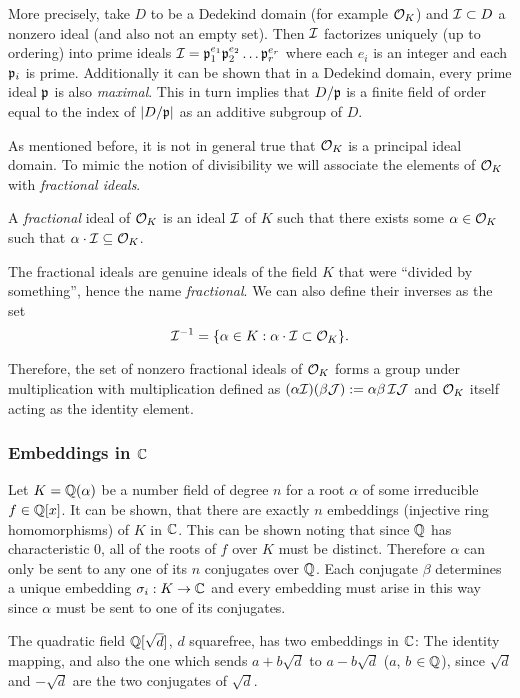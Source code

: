 More precisely, take $D$ to be a Dedekind domain (for example $\mathcal{O}_K$) and $\mathcal{I} \subset D$ a nonzero ideal (and also not an empty set). Then $\mathcal{I}$ factorizes uniquely (up to ordering) into prime ideals $\mathcal{I} = \mathfrak{p}_1^{e_1} \mathfrak{p}_2^{e_2} \ldots \mathfrak{p}_r^{e_r}$ where each $e_i$ is an integer and each $\mathfrak{p}_i$ is prime. Additionally it can be shown that in a Dedekind domain, every prime ideal $\mathfrak{p}$ is also \textit{maximal}. This in turn implies that $D/\mathfrak{p}$ is a finite field of order equal to the index of $|D /\mathfrak{p}|$ as an additive subgroup of $D$.

As mentioned before, it is not in general true that $\mathcal{O}_K$ is a principal ideal domain. To mimic the notion of divisibility we will associate the elements of $\mathcal{O}_K$ with \textit{fractional ideals}.
\begin{definition}
	A \textit{fractional} ideal of $\mathcal{O}_K$ is an ideal $\mathcal{I}$ of $K$ such that there exists some $\alpha \in \mathcal{O}_K$ such that $\alpha \cdot \mathcal{I} \subseteq \mathcal{O}_K$.
\end{definition}
The fractional ideals are genuine ideals of the field $K$ that were ``divided by something'', hence the name \textit{fractional}. We can also define their inverses as the set
\[ \mathcal{I}^{-1} = \{ \alpha \in K : \alpha \cdot \mathcal{I} \subset \mathcal{O}_K \}. \]

Therefore, the set of nonzero fractional ideals of $\mathcal{O}_K$ forms a group under multiplication with multiplication defined as $(\alpha \mathcal{I})(\beta \mathcal{J}) := \alpha \beta \, \mathcal{I} \mathcal{J}$ and $\mathcal{O}_K$ itself acting as the identity element. %

\subsubsection*{Embeddings in $\mathbb{C}$} 
Let $K = \mathbb{Q}(\alpha)$ be a number field of degree $n$ for a root $\alpha$ of some irreducible $f \in \mathbb{Q}[x]$. It can be shown, that there are exactly $n$ embeddings (injective ring homomorphisms) of $K$ in $\mathbb{C}$. This can be shown noting that since $\mathbb{Q}$ has characteristic 0, all of the roots of $f$ over $K$ must be distinct. Therefore $\alpha$ can only be sent to any one of its $n$ conjugates over $\mathbb{Q}$. Each conjugate $\beta$ determines a unique embedding $\sigma_i: K \rightarrow \mathbb{C}$ and every embedding must arise in this way since $\alpha$ must be sent to one of its conjugates.

\begin{example}
    The quadratic field $\mathbb{Q}[\sqrt{d}]$, $d$ squarefree, has two embeddings in $\mathbb{C}$: The identity mapping, and also the one which sends $a + b\sqrt{d}$ to $a - b\sqrt{d}$ ($a$, $b$ $\in \mathbb{Q}$), since $\sqrt{d}$ and $-\sqrt{d}$ are the two conjugates of $\sqrt{d}$.
\end{example}
 
